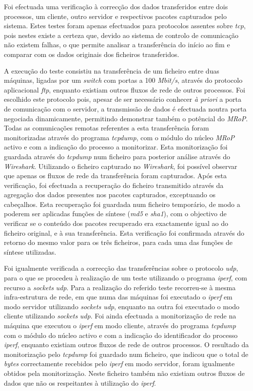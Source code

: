 Foi efectuada uma verificação à correcção dos dados transferidos entre dois processos, um cliente, outro servidor e respectivos pacotes capturados pelo sistema.
Estes testes foram apenas efectuados para protocolos assentes sobre \textit{tcp}, pois nestes existe a certeza que, devido ao sistema de controlo de comunicação não existem falhas, o que permite analisar a transferência do início ao fim e comparar com os dados originais dos ficheiros transferidos.

A execução do teste consistiu na transferência de um ficheiro entre duas máquinas, ligadas por um \textit{switch} com portas a 100 \textit{Mbit/s}, através do protocolo aplicacional \textit{ftp}, enquanto existiam outros fluxos de rede de outros processos.
Foi escolhido este protocolo pois, apesar de ser necessário conhecer \textit{à priori} a porta de comunicação com o servidor, a transmissão de dados é efectuada noutra porta negociada dinamicamente, permitindo demonstrar também o potêncial do \textit{MRoP}.
Todas as comunicações remotas referentes a esta transferência foram monitorizadas através do programa \textit{tcpdump}, com o módulo do núcleo \textit{MRoP} activo e com a indicação do processo a monitorizar.
Esta monitorização foi guardada através do \textit{tcpdump} num ficheiro para posterior análise através do \textit{Wireshark}.
Utilizando o ficheiro capturado no \textit{Wireshark}, foi possível observar que apenas os fluxos de rede da transferência foram capturados.
Após esta verificação, foi efectuada a recuperação do ficheiro transmitido através da agregação dos dados presentes nos pacotes capturados, exceptuando os cabeçalhos.
Esta recuperação foi guardada num ficheiro temporário, de modo a poderem ser aplicadas funções de síntese (\textit{md5} e \textit{sha1}), com o objectivo de verificar se o conteúdo dos pacotes recuperado era exactamente igual ao do ficheiro original, e à sua transferência.
Esta verificação foi confirmada através do retorno do mesmo valor para os três ficheiros, para cada uma das funções de síntese utilizadas.

Foi igualmente verificada a correcção das transferências sobre o protocolo \textit{udp}, para o que se procedeu à realização de um teste utilizando o programa \textit{iperf}, com recurso a \textit{sockets} \textit{udp}.
Para a realização do referido teste recorreu-se à mesma infra-estrutura de rede, em que numa das máquinas foi executado o \textit{iperf} em modo servidor utilizando \textit{sockets udp}, enquanto na outra foi executado o modo cliente utilizando \textit{sockets} \textit{udp}.
Foi ainda efectuada a monitorização de rede na máquina que executou o \textit{iperf} em modo cliente, através do programa \textit{tcpdump} com o módulo do núcleo activo e com a indicação do identificador do processo \textit{iperf}, enquanto existiam outros fluxos de rede de outros processos.
O resultado da monitorização pelo \textit{tcpdump} foi guardado num ficheiro, que indicou que o total de \textit{bytes} correctamente recebidos pelo \textit{iperf} em modo servidor, foram igualmente obtidos pela monitorização.
Neste ficheiro também não existiam outros fluxos de dados que não os respeitantes à utilização do \textit{iperf}.

